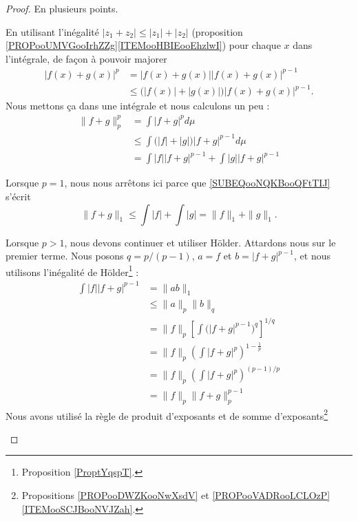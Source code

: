 \begin{proof}
	En plusieurs points.
	\begin{subproof}
		En utilisant l'inégalité \( | z_1+z_2 |\leq | z_1 |+| z_2 |\) (proposition \ref{PROPooUMVGooIrhZZg}\ref{ITEMooHBIEooEhzlwI}) pour chaque \( x\) dans l'intégrale, de façon à pouvoir majorer
		\begin{subequations}
			\begin{align}
				| f(x)+g(x) |^p & =| f(x)+g(x) | |f(x)+g(x) |^{p-1}                     \\
				                & \leq\big( | f(x) |+| g(x) | \big)| f(x)+g(x) |^{p-1}.
			\end{align}
		\end{subequations}
		Nous mettons ça dans une intégrale et nous calculons un peu :
		\begin{subequations}        \label{SUBEQSooGWMTooDBXSgL}
			\begin{align}
				\| f+g \|^p_p & =\int| f+g |^pd\mu                                                                                  \\
				              & \leq \int\big( | f |+| g | \big)| f+g |^{p-1}d\mu                       \label{SUBEQooYCTWooQpHNqa} \\
				              & =\int| f | |f+g |^{p-1}+\int| g | |f+g |^{p-1} \label{SUBEQooNQKBooQFtTIJ}
			\end{align}
		\end{subequations}

		Lorsque \( p=1\), nous nous arrêtons ici parce que \eqref{SUBEQooNQKBooQFtTIJ} s'écrit
		\begin{equation}
			\| f+g \|_1\leq\int| f |+\int| g |=\| f \|_1+\| g \|_1.
		\end{equation}

		Lorsque \( p>1\), nous devons continuer et utiliser Hölder. Attardons nous sur le premier terme. Nous posons \( q=p/(p-1)\), \( a=f\) et \( b=| f+g |^{p-1}\), et nous utilisons l'inégalité de Hölder\footnote{Proposition \ref{ProptYqspT}.} :
		\begin{subequations}        \label{SUBEQSooFINUooQfIdMS}
			\begin{align}
				\int| f | |f+g |^{p-1} & =\| ab \|_1                                                      \\
				                       & \leq \| a \|_p\| b \|_q                                          \\
				                       & =\| f \|_p \left[ \int \big( | f+g |^{p-1} \big)^q \right]^{1/q} \\
				                       & =\| f \|_p\left( \int| f+g |^p \right)^{1-\frac{1}{ p }}         \\
				                       & =\| f \|_p\left( \int| f+g |^p \right)^{(p-1)/p}                 \\
				                       & = \| f \|_p\| f+g \|_p^{p-1}
			\end{align}
		\end{subequations}
		Nous avons utilisé la règle de produit d'exposants et de somme d'exposants\footnote{Propositions \ref{PROPooDWZKooNwXsdV} et \ref{PROPooVADRooLCLOzP}\ref{ITEMooSCJBooNVJZah}.}


\end{subproof}
\end{proof}
